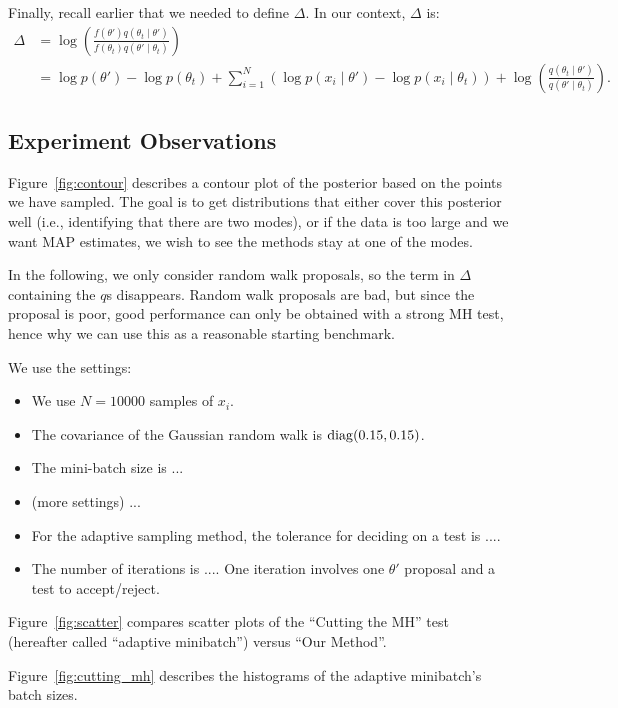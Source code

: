 \documentclass{article}
\begin{document}
Finally, recall earlier that we needed to define $\Delta$. In our context, $\Delta$ is:
\begin{align}
\Delta &= \log \left(\frac{f(\theta') q(\theta_t \mid \theta')}{f(\theta_t) q(\theta'\mid \theta_t)} \right) \\
&= \log p(\theta') - \log p(\theta_t) + \sum_{i=1}^N(\log p(x_i \mid \theta') - \log p(x_i \mid \theta_t)) + \log\left(\frac{q(\theta_t \mid \theta')}{q(\theta' \mid \theta_t)}\right).
\end{align}

\subsection{Experiment Observations}

Figure~\ref{fig:contour} describes a contour plot of the posterior based on the points we have
sampled. The goal is to get distributions that either cover this posterior well (i.e., identifying
that there are two modes), or if the data is too large and we want MAP estimates, we wish to see the
methods stay at one of the modes.

In the following, we only consider random walk proposals, so the term in $\Delta$ containing the
$q$s disappears.  Random walk proposals are bad, but since the proposal is poor, good performance
can only be obtained with a strong MH test, hence why we can use this as a reasonable starting
benchmark.

We use the settings:

\begin{itemize}[noitemsep]
    \item We use $N=10000$ samples of $x_i$.
    \item The covariance of the Gaussian random walk is ${\rm diag}(0.15, 0.15)$.
    \item The mini-batch size is ...
    \item (more settings) ...
    \item For the adaptive sampling method, the tolerance for deciding on a test is ....
    \item The number of iterations is .... One iteration involves one $\theta'$ proposal and a test
    to accept/reject.
\end{itemize}

Figure~\ref{fig:scatter} compares scatter plots of the ``Cutting the MH'' test (hereafter called
``adaptive minibatch'') versus ``Our Method''.

Figure~\ref{fig:cutting_mh} describes the histograms of the adaptive minibatch's batch sizes.
\end{document}

